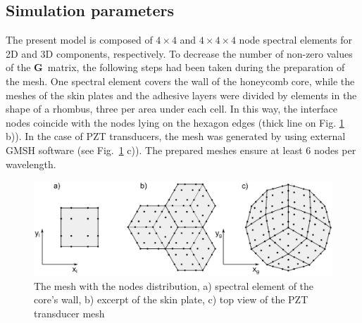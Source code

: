 \documentclass[a4paper,12pt]{article}
\begin{document}
{\subsection{Simulation parameters}
\label{sec:simulation}
The present model is composed of \(4 \times 4\) and \(4 \times 4 \times 4\) node spectral elements for 2D and 3D components, respectively.
To decrease the number of non-zero values of the \(\textbf{G}\)~matrix, the following steps had been taken during the preparation of the mesh.
One spectral element covers the wall of the honeycomb core, while the meshes of the skin plates and the adhesive layers were divided by elements in the shape of a rhombus, three per area under each cell.
In this way, the interface nodes coincide with the nodes lying on the hexagon edges (thick line on Fig. \ref{fig:skin_mesh} b)).
In the case of PZT transducers, the mesh was generated by using external GMSH software \cite{geuzaine2009gmsh} (see Fig.~\ref{fig:skin_mesh} c)).
The prepared meshes ensure at least 6 nodes per wavelength.
\begin{figure}
	\begin{center}
		\includegraphics[width=1\linewidth]{../../../figures/eps/skin_mesh.eps}
	\end{center}
	\caption{The mesh with the nodes distribution, a) spectral element of the core's wall, b) excerpt of the skin plate, c) top view of the PZT transducer mesh}
	\label{fig:skin_mesh}
\end{figure}

}
\end{document}
